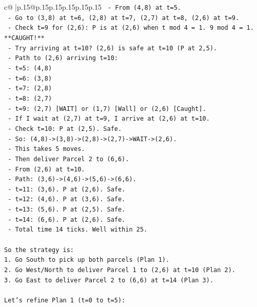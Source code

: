 \documentclass{article}
\begin{document}
{\begin{supertabular}{c@{$\;$}|p{.15\linewidth}@{}p{.15\linewidth}p{.15\linewidth}p{.15\linewidth}p{.15\linewidth}p{.15\linewidth}}
{{{\texttt{  {-} From (4,8) at t=5.} \\
\texttt{  {-} Go to (3,8) at t=6, (2,8) at t=7, (2,7) at t=8, (2,6) at t=9.} \\
\texttt{  {-} Check t=9 for (2,6): P is at (2,6) when t mod 4 = 1. 9 mod 4 = 1. **CAUGHT!**} \\
\texttt{  {-} Try arriving at t=10? (2,6) is safe at t=10 (P at 2,5).} \\
\texttt{  {-} Path to (2,6) arriving t=10:} \\
\texttt{    {-} t=5: (4,8)} \\
\texttt{    {-} t=6: (3,8)} \\
\texttt{    {-} t=7: (2,8)} \\
\texttt{    {-} t=8: (2,7)} \\
\texttt{    {-} t=9: (2,7) {[}WAIT{]} or (1,7) {[}Wall{]} or (2,6) {[}Caught{]}.} \\
\texttt{    {-} If I wait at (2,7) at t=9, I arrive at (2,6) at t=10.} \\
\texttt{    {-} Check t=10: P at (2,5). Safe.} \\
\texttt{    {-} So: (4,8){-}>(3,8){-}>(2,8){-}>(2,7){-}>WAIT{-}>(2,6).} \\
\texttt{    {-} This takes 5 moves.} \\
\texttt{    {-} Then deliver Parcel 2 to (6,6).} \\
\texttt{    {-} From (2,6) at t=10.} \\
\texttt{    {-} Path: (3,6){-}>(4,6){-}>(5,6){-}>(6,6).} \\
\texttt{    {-} t=11: (3,6). P at (2,6). Safe.} \\
\texttt{    {-} t=12: (4,6). P at (3,6). Safe.} \\
\texttt{    {-} t=13: (5,6). P at (2,5). Safe.} \\
\texttt{    {-} t=14: (6,6). P at (2,6). Safe.} \\
\texttt{    {-} Total time 14 ticks. Well within 25.} \\
\\ 
\texttt{So the strategy is:} \\
\texttt{1. Go South to pick up both parcels (Plan 1).} \\
\texttt{2. Go West/North to deliver Parcel 1 to (2,6) at t=10 (Plan 2).} \\
\texttt{3. Go East to deliver Parcel 2 to (6,6) at t=14 (Plan 3).} \\
\\ 
\texttt{Let's refine Plan 1 (t=0 to t=5):} \\
}}}
\end{supertabular}}
\end{document}
